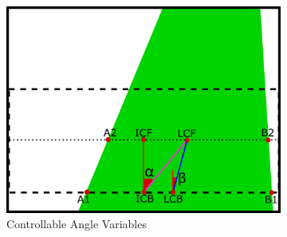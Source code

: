 \documentclass[a4paper,12pt]{article}
\begin{document}
\begin{itemize}[A.]
\begin{itemize}
\end{itemize}	   












\begin{figure}[H]

\setlength{\unitlength}{\textwidth} 

\centering

\begin{subfigure}{.46\textwidth}

\centering

\includegraphics[width=0.45\unitlength]{images/ang_cont}

\caption{\label{fig:ang-cont} Controllable Angle Variables }

\end{subfigure}%
\begin{subfigure}{.46\textwidth}

\centering


\end{subfigure}
\end{figure}
\end{itemize}
\end{document}
